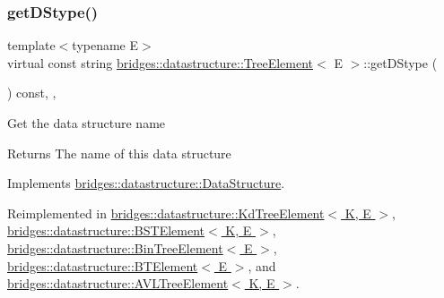 \subsubsection{\texorpdfstring{get\+D\+Stype()}{getDStype()}}
{\footnotesize\ttfamily template$<$typename E$>$ \\
virtual const string \hyperlink{classbridges_1_1datastructure_1_1_tree_element}{bridges\+::datastructure\+::\+Tree\+Element}$<$ E $>$\+::get\+D\+Stype (\begin{DoxyParamCaption}{ }\end{DoxyParamCaption}) const\hspace{0.3cm}{\ttfamily [inline]}, {\ttfamily [override]}, {\ttfamily [virtual]}}

Get the data structure name \begin{DoxyReturn}{Returns}
The name of this data structure 
\end{DoxyReturn}


Implements \hyperlink{classbridges_1_1datastructure_1_1_data_structure_a4ff66cb34409f11fe9fc647f6d8a22ce}{bridges\+::datastructure\+::\+Data\+Structure}.



Reimplemented in \hyperlink{classbridges_1_1datastructure_1_1_kd_tree_element_a76f6d9bfadfdec09d0a8564aa0e33235}{bridges\+::datastructure\+::\+Kd\+Tree\+Element$<$ K, E $>$}, \hyperlink{classbridges_1_1datastructure_1_1_b_s_t_element_a2bb8cc9ec4b6bc5b89ecef0f17be366f}{bridges\+::datastructure\+::\+B\+S\+T\+Element$<$ K, E $>$}, \hyperlink{classbridges_1_1datastructure_1_1_bin_tree_element_aef86e3663785972251547e409fdc757b}{bridges\+::datastructure\+::\+Bin\+Tree\+Element$<$ E $>$}, \hyperlink{classbridges_1_1datastructure_1_1_b_t_element_a2118b6b74f3fe0fec39e3b258a7dee89}{bridges\+::datastructure\+::\+B\+T\+Element$<$ E $>$}, and \hyperlink{classbridges_1_1datastructure_1_1_a_v_l_tree_element_ab04d1e9ad4630e408041e8137dc9854a}{bridges\+::datastructure\+::\+A\+V\+L\+Tree\+Element$<$ K, E $>$}.

\mbox{\label{classbridges_1_1datastructure_1_1_tree_element_ad894ec5edfa66ddf59dd83a8712b48f1}} 
